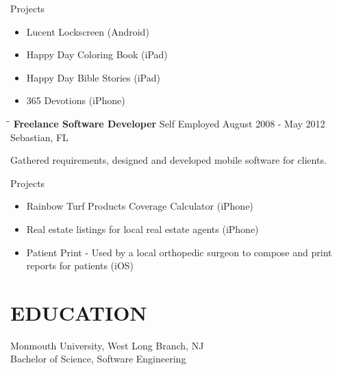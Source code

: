 \documentclass{res}
\begin{document}
\begin{resume}
    Projects
    \begin{itemize}
        \item Lucent Lockscreen (Android)
        \item Happy Day Coloring Book (iPad)
        \item Happy Day Bible Stories (iPad)
        \item 365 Devotions (iPhone)
    \end{itemize}

   \begin{tabbing}
   \hspace{2.3in}\= \hspace{2.6in}\= \kill %
    {\bf Freelance Software Developer} \>Self Employed  \>August 2008 - May 2012\\
                             \>Sebastian, FL
   \end{tabbing}\vspace{-20pt}      %
   Gathered requirements, designed and developed mobile software for clients. 

    Projects
    \begin{itemize}
      \item Rainbow Turf Products Coverage Calculator (iPhone)
      \item Real estate listings for local real estate agents (iPhone)
      \item Patient Print - Used by a local orthopedic surgeon to compose and print reports for patients (iOS)
    \end{itemize}

\section{EDUCATION}          
    Monmouth University, West Long Branch, NJ  \\        
    Bachelor of Science, Software Engineering   \\       



\end{resume}
\end{document}
